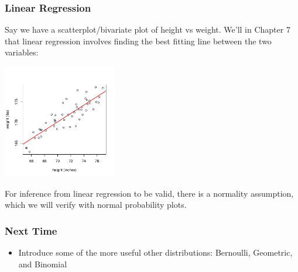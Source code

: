 \documentclass[handout]{beamer}
\newcommand{\blue}[1]{\textcolor{blue2}{#1}}
\begin{document}
\begin{frame}
\frametitle{Linear Regression}
Say we have a scatterplot/bivariate plot of height vs weight.  We'll in Chapter 7 that \blue{linear regression} involves finding the \blue{best fitting line} between the two variables:

\begin{center}
\includegraphics[width=5cm]{figure/lec24-003.pdf}
\end{center}

\pause For inference from linear regression to be valid, there is a normality assumption, which we will verify with normal probability plots.  

\end{frame}


\begin{frame}[fragile]
\frametitle{Next Time}

\begin{itemize}
\item Introduce some of the more useful other distributions: Bernoulli, Geometric, and Binomial
\end{itemize}


\end{frame}
\end{document}
